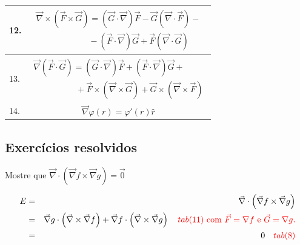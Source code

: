 \begin{table}
\begin{tabular}{|l|c|}
\hline
12.&$\displaystyle\begin{array}{l}\vec{\nabla}\times\left( \vec{F}\times \vec{G}\right)=\left(\vec{G}\cdot \vec{\nabla}\right)\vec{F}-\vec{G}\left(\vec{\nabla}\cdot \vec{F}\right)-\\ ~\qquad\qquad\qquad-\left(\vec{F}\cdot \vec{\nabla}\right)\vec{G}+\vec{F}\left(\vec{\nabla}\cdot \vec{G}\right)\end{array}$\\
\hline
13.&$\displaystyle\begin{array}{l}\vec{\nabla}\left( \vec{F}\cdot \vec{G}\right)=\left(\vec{G}\cdot \vec{\nabla}\right)\vec{F}+\left(\vec{F}\cdot \vec{\nabla}\right)\vec{G}+\\\qquad\qquad\quad+\vec{F}\times\left(\vec{\nabla} \times \vec{G}\right)+\vec{G}\times\left(\vec{\nabla} \times \vec{F}\right)\end{array}$\\
\hline
14.&$\vec{\nabla}\varphi(r) = \varphi'(r)\hat{r}$\\
\hline
\end{tabular}
\end{table}

\subsection*{Exercícios resolvidos}
\begin{exeresol}
  Mostre que $\vec{\nabla}\cdot\left(\vec{\nabla}f \times \vec{\nabla}g\right)=\vec{0}$
\end{exeresol}
\begin{resol}
\begin{eqnarray*}
 E&=&\vec{\nabla}\cdot\left(\vec{\nabla}f \times \vec{\nabla}g\right) \\
  &=&\vec{\nabla}g\cdot\left(\vec{\nabla}\times \vec{\nabla}f\right)+\vec{\nabla}f\cdot\left(\vec{\nabla}\times \vec{\nabla}g\right) ~~~{\color{red} tab(11)~\text{com}~\vec{F}=\nabla f~\text{e}~\vec{G}=\nabla g.}\\
  &=&0~~~{\color{red} tab(8)}\\
\end{eqnarray*}
\end{resol}

